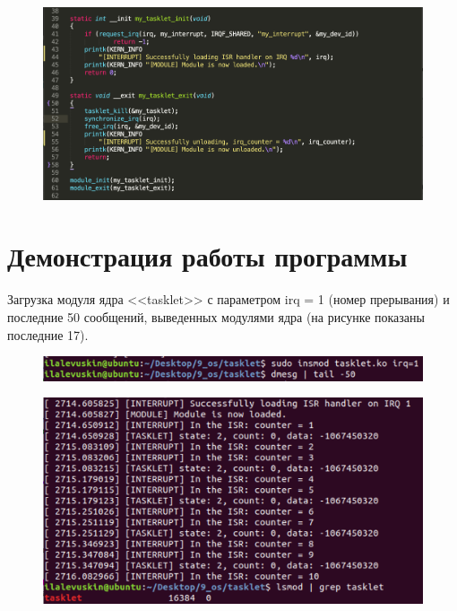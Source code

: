 \documentclass[a4paper,12pt]{article}
\begin{document}
	\newpage

	\begin{figure}[h!]
		\begin{center}
			{\includegraphics[scale = 0.7]{listing2.png}}
			\label{listing2}
		\end{center}
	\end{figure}

	\newpage
	
	\section*{Демонстрация работы программы}
	
	Загрузка модуля ядра <<tasklet>> с параметром irq = 1 (номер прерывания) и последние 50 сообщений, выведенных модулями ядра (на рисунке показаны последние 17).
	
	\begin{figure}[h!]
		\begin{center}
			{\includegraphics[scale = 0.7]{1.png}}
			\label{1}
		\end{center}
	\end{figure}

	\begin{figure}[h!]
		\begin{center}
			{\includegraphics[scale = 0.7]{2.png}}
			\label{2}
		\end{center}
	\end{figure}
	
\end{document}

